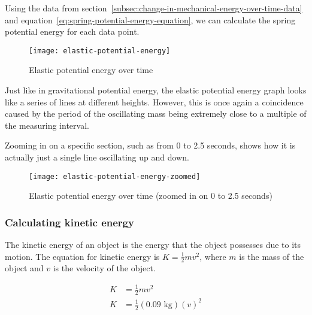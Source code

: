 \documentclass{article}
\begin{document}
                Using the data from section~\ref{subsec:change-in-mechanical-energy-over-time-data} and equation~\ref{eq:spring-potential-energy-equation}, we can calculate the spring potential energy for each data point.
                
                \begin{figure}[H]
                    \centering
                    \texttt{[image: elastic-potential-energy]}
                    \caption{Elastic potential energy over time}
                    \label{fig:elastic-potential-energy}
                \end{figure}
                
                Just like in gravitational potential energy, the elastic potential energy graph looks like a series of lines at different heights.
                However, this is once again a coincidence caused by the period of the oscillating mass being extremely close to a multiple of the measuring interval.
                
                Zooming in on a specific section, such as from 0 to 2.5 seconds, shows how it is actually just a single line oscillating up and down.
                
                \begin{figure}[H]
                    \centering
                    \texttt{[image: elastic-potential-energy-zoomed]}
                    \caption{Elastic potential energy over time (zoomed in on 0 to 2.5 seconds)}
                    \label{fig:elastic-potential-energy-zoomed}
                \end{figure}
            
            \subsubsection{Calculating kinetic energy}
                
                The kinetic energy of an object is the energy that the object possesses due to its motion.
                The equation for kinetic energy is $K = \frac{1}{2}mv^2$, where $m$ is the mass of the object and $v$ is the velocity of the object.
                
                \begin{equation}
                    \begin{aligned}
                        K &= \frac{1}{2}mv^2 \\
                        K &= \frac{1}{2}(0.09 \text{ kg})(v)^2 \\
                    \end{aligned}\label{eq:kinetic-energy-equation}
                \end{equation}
                
\end{document}
